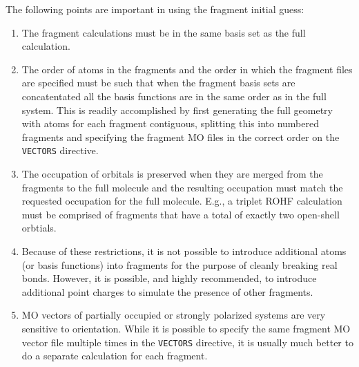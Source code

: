 The following points are important in using the fragment initial guess:
\begin{enumerate}
\item The fragment calculations must be in the same basis set as the
  full calculation.
\item The order of atoms in the fragments and the order in which the
  fragment files are specified must be such that when the fragment
  basis sets are concatentated all the basis functions are in the same
  order as in the full system.  This is readily accomplished by first
  generating the full geometry with atoms for each fragment
  contiguous, splitting this into numbered fragments and specifying
  the fragment MO files in the correct order on the \verb+VECTORS+
  directive.
\item The occupation of orbitals is preserved when they are merged
  from the fragments to the full molecule and the resulting occupation
  must match the requested occupation for the full molecule.  E.g., a
  triplet ROHF calculation must be comprised of fragments that have
  a total of exactly two open-shell orbtials. 
\item Because of these restrictions, it is not possible to introduce
  additional atoms (or basis functions) into fragments for the purpose
  of cleanly breaking real bonds.  However, it is possible, and highly
  recommended, to introduce additional point charges to simulate the
  presence of other fragments.
\item MO vectors of partially occupied or strongly polarized systems
  are very sensitive to orientation.  While it is possible to specify
  the same fragment MO vector file multiple times in the
  \verb+VECTORS+ directive, it is usually much better to do a separate
  calculation for each fragment.
\end{enumerate}

